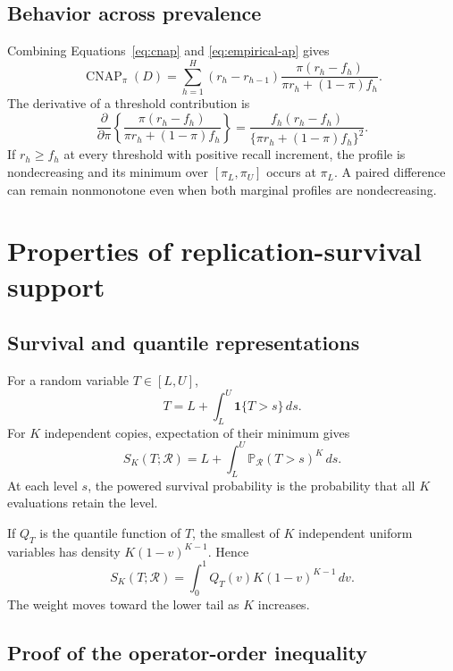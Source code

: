 \documentclass[11pt]{article}
\newcommand{\CNAP}{\operatorname{CNAP}}
\newcommand{\Regime}{\mathcal{R}}
\newcommand{\Prb}{\mathbb{P}}
\theoremstyle{remark}
\begin{document}
\subsection{Behavior across prevalence}

Combining Equations~\eqref{eq:cnap} and \eqref{eq:empirical-ap} gives
\begin{equation}
\CNAP_\pi(D)
=
\sum_{h=1}^{H}
(r_h-r_{h-1})
\frac{\pi(r_h-f_h)}
{\pi r_h+(1-\pi)f_h}.
\label{eq:cnap-profile}
\end{equation}
The derivative of a threshold contribution is
\begin{equation}
\frac{\partial}{\partial\pi}
\left\{
\frac{\pi(r_h-f_h)}
{\pi r_h+(1-\pi)f_h}
\right\}
=
\frac{f_h(r_h-f_h)}
{\{\pi r_h+(1-\pi)f_h\}^2}.
\label{eq:cnap-derivative}
\end{equation}
If $r_h\geq f_h$ at every threshold with positive recall increment, the profile is nondecreasing and its minimum over $[\pi_L,\pi_U]$ occurs at $\pi_L$. A paired difference can remain nonmonotone even when both marginal profiles are nondecreasing.

\section{Properties of replication-survival support}
\label{app:support-proofs}

\subsection{Survival and quantile representations}

For a random variable $T\in[L,U]$,
\[
T=L+\int_L^U\mathbf 1\{T>s\}\,ds.
\]
For $K$ independent copies, expectation of their minimum gives
\begin{equation}
S_K(T;\Regime)
=
L+\int_L^U\Prb_{\Regime}(T>s)^K\,ds.
\label{eq:survival-representation}
\end{equation}
At each level $s$, the powered survival probability is the probability that all $K$ evaluations retain the level.

If $Q_T$ is the quantile function of $T$, the smallest of $K$ independent uniform variables has density $K(1-v)^{K-1}$. Hence
\begin{equation}
S_K(T;\Regime)
=
\int_0^1Q_T(v)K(1-v)^{K-1}\,dv.
\label{eq:quantile-weight}
\end{equation}
The weight moves toward the lower tail as $K$ increases.

\subsection{Proof of the operator-order inequality}
\end{document}
